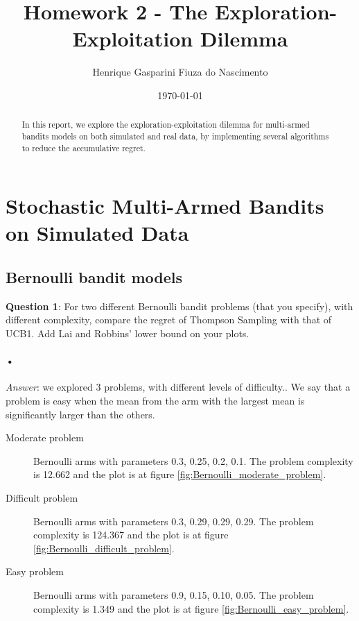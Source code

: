 \documentclass[a4paper]{article}
\title{Homework 2 - The Exploration-Exploitation Dilemma}
\author{Henrique Gasparini Fiuza do Nascimento}
\date{\today}
\begin{document}
\maketitle

\begin{abstract}

In this report, we explore the exploration-exploitation dilemma for multi-armed bandits models on both simulated and real data, by implementing several algorithms to reduce the accumulative regret.

\end{abstract}

\section{Stochastic Multi-Armed Bandits on Simulated Data}
\label{sec:first_exercise}

\subsection{Bernoulli bandit models}

\textbf{Question 1}: For two different Bernoulli bandit problems (that you specify), with different complexity, compare the regret of Thompson Sampling with that of UCB1. Add Lai and Robbins’ lower bound on your plots.
\paragraph{•}
\textit{Answer}: we explored 3 problems, with different levels of difficulty.. We say that a problem is easy when the mean from the arm with the largest mean is significantly larger than the others.

\begin{description}
\item[Moderate problem] Bernoulli arms with parameters 0.3, 0.25, 0.2, 0.1. The problem complexity is 12.662 and the plot is at figure \ref{fig:Bernoulli_moderate_problem}.
\item[Difficult problem] Bernoulli arms with parameters 0.3, 0.29, 0.29, 0.29. The problem complexity is 124.367 and the plot is at figure \ref{fig:Bernoulli_difficult_problem}.
\item[Easy problem] Bernoulli arms with parameters 0.9, 0.15, 0.10, 0.05. The problem complexity is 1.349 and the plot is at figure \ref{fig:Bernoulli_easy_problem}.

\end{description}
\end{document}
